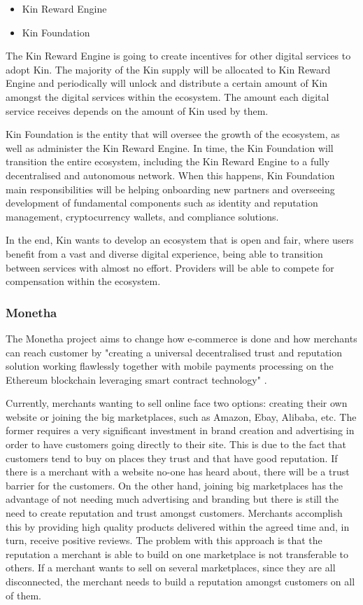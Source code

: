 \begin{itemize}
	\item Kin Reward Engine
	\item Kin Foundation
\end{itemize}

The Kin Reward Engine is going to create incentives for other digital services to adopt Kin. The majority of the Kin supply will be allocated to Kin Reward Engine and periodically will unlock and distribute a certain amount of Kin amongst the digital services within the ecosystem. The amount each digital service receives depends on the amount of Kin used by them.

Kin Foundation is the entity that will oversee the growth of the ecosystem, as well as administer the Kin Reward Engine. In time, the Kin Foundation will transition the entire ecosystem, including the Kin Reward Engine to a fully decentralised and autonomous network. When this happens, Kin Foundation main responsibilities will be helping onboarding new partners and overseeing development of fundamental components such as identity and reputation management, cryptocurrency wallets, and compliance solutions.

In the end, Kin wants to develop an ecosystem that is open and fair, where users benefit from a vast and diverse digital experience, being able to transition between services with almost no effort. Providers will be able to compete for compensation within the ecosystem.

\subsubsection{Monetha}

The Monetha project aims to change how e-commerce is done and how merchants can reach customer by "creating a universal decentralised trust and reputation solution working flawlessly together with mobile payments processing on the Ethereum blockchain leveraging smart contract technology" \cite{MONETHA}.

Currently, merchants wanting to sell online face two options: creating their own website or joining the big marketplaces, such as Amazon, Ebay, Alibaba, etc. The former requires a very significant investment in brand creation and advertising in order to have customers going directly to their site. This is due to the fact that customers tend to buy on places they trust and that have good reputation. If there is a merchant with a website no-one has heard about, there will be a trust barrier for the customers. On the other hand, joining big marketplaces has the advantage of not needing much advertising and branding but there is still the need to create reputation and trust amongst customers. Merchants accomplish this by providing high quality products delivered within the agreed time and, in turn, receive positive reviews. The problem with this approach is that the reputation a merchant is able to build on one marketplace is not transferable to others. If a merchant wants to sell on several marketplaces, since they are all disconnected, the merchant needs to build a reputation amongst customers on all of them.

